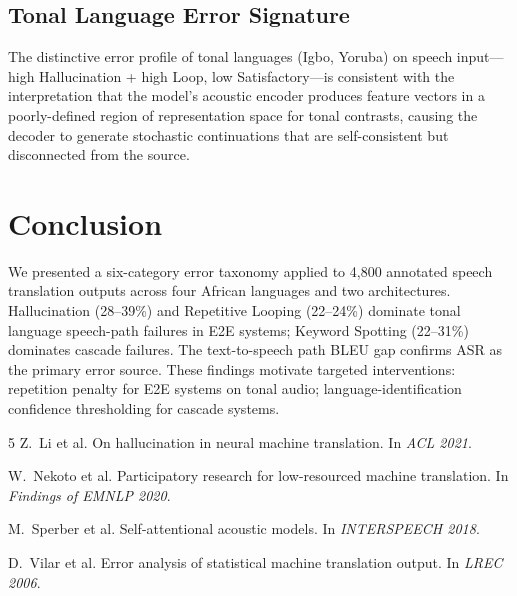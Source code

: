 \documentclass[11pt,a4paper]{article}
\begin{document}
\subsection{Tonal Language Error Signature}
The distinctive error profile of tonal languages (Igbo, Yoruba) on speech input—high Hallucination + high Loop, low Satisfactory—is consistent with the interpretation that the model's acoustic encoder produces feature vectors in a poorly-defined region of representation space for tonal contrasts, causing the decoder to generate stochastic continuations that are self-consistent but disconnected from the source.

\section{Conclusion}
\label{sec:conclusion}

We presented a six-category error taxonomy applied to 4,800 annotated speech translation outputs across four African languages and two architectures. Hallucination (28–39\%) and Repetitive Looping (22–24\%) dominate tonal language speech-path failures in E2E systems; Keyword Spotting (22–31\%) dominates cascade failures. The text-to-speech path BLEU gap confirms ASR as the primary error source. These findings motivate targeted interventions: repetition penalty for E2E systems on tonal audio; language-identification confidence thresholding for cascade systems.




\begin{thebibliography}{5}
Z.~Li et al.
\newblock On hallucination in neural machine translation.
\newblock In \emph{ACL 2021}.

W.~Nekoto et al.
\newblock Participatory research for low-resourced machine translation.
\newblock In \emph{Findings of EMNLP 2020}.

M.~Sperber et al.
\newblock Self-attentional acoustic models.
\newblock In \emph{INTERSPEECH 2018}.

D.~Vilar et al.
\newblock Error analysis of statistical machine translation output.
\newblock In \emph{LREC 2006}.
\end{thebibliography}
\end{document}
